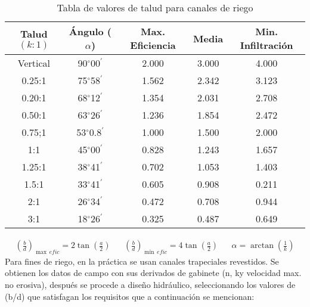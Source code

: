 \begin{table}[h!]
    \centering
    \begin{tabular}{@{}ccccc@{}}
    \toprule
    Talud $(k:1)$ & Ángulo ($\alpha$) & Max. Eficiencia & Media & Min. Infiltración \\ \midrule
    Vertical      & 90$^{\circ}$00$^{\prime}$            & 2.000           & 3.000 & 4.000             \\
    0.25:1        & 75$^{\circ}$58$^{\prime}$            & 1.562           & 2.342 & 3.123             \\
    0.20:1        & 68$^{\circ}$12$^{\prime}$            & 1.354           & 2.031 & 2.708             \\
    0.50:1        & 63$^{\circ}$26$^{\prime}$            & 1.236           & 1.854 & 2.472             \\
    0.75;1        & 53$^{\circ}$0.8$^{\prime}$           & 1.000           & 1.500 & 2.000             \\
    1:1           & 45$^{\circ}$00$^{\prime}$            & 0.828           & 1.243 & 1.657             \\
    1.25:1        & 38$^{\circ}$41$^{\prime}$            & 0.702           & 1.053 & 1.403             \\
    1.5:1         & 33$^{\circ}$41$^{\prime}$            & 0.605           & 0.908 & 0.211             \\
    2:1           & 26$^{\circ}$34$^{\prime}$            & 0.472           & 0.708 & 0.944             \\ 
    3:1           & 18$^{\circ}$26$^{\prime}$            & 0.325           & 0.487 & 0.649             \\ \bottomrule
\end{tabular}
    \caption{Tabla de valores de talud para canales de riego}
    \label{tabhb41}
\end{table}
\begin{align*}
    \left(\frac{b}{d} \right)_{\max\, efic}= 2 \tan{\left( \frac{a}{2}\right)}&&\left(\frac{b}{d} \right)_{\min\, efic}= 4\tan{\left( \frac{a}{2}\right)}&& \alpha= \arctan{\left(\frac{1}{k}\right)}
\end{align*}
Para fines de riego, en la práctica se usan canales trapeciales revestidos.
Se obtienen los datos de campo con sus derivados de gabinete (n, ky velocidad max. no erosiva), después se procede a diseño hidráulico, seleccionando los valores de (b/d) que satisfagan los requisitos que a continuación se mencionan:
